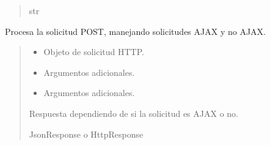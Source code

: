 \documentclass[letterpaper,10pt,spanish]{sphinxmanual}
\begin{document}
\begin{fulllineitems}
\begin{fulllineitems}
\begin{quote}
\begin{description}
\sphinxAtStartPar
str

\end{description}\end{quote}

\end{fulllineitems}



\begin{fulllineitems}

\pysigstartsignatures
{}
\pysigstopsignatures
\sphinxAtStartPar
Procesa la solicitud POST, manejando solicitudes AJAX y no AJAX.
\begin{quote}\begin{description}
\begin{itemize}
\item {} 
\sphinxAtStartPar
{} \textendash{} Objeto de solicitud HTTP.

\item {} 
\sphinxAtStartPar
{} \textendash{} Argumentos adicionales.

\item {} 
\sphinxAtStartPar
{} \textendash{} Argumentos adicionales.

\end{itemize}

\sphinxAtStartPar
Respuesta dependiendo de si la solicitud es AJAX o no.

\sphinxAtStartPar
JsonResponse o HttpResponse

\end{description}\end{quote}

\end{fulllineitems}



\begin{fulllineitems}

\pysigstartsignatures
{}
\pysigstopsignatures
\end{fulllineitems}


\end{fulllineitems}
\end{document}
